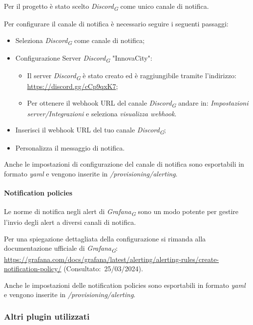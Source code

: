 Per il progetto è stato scelto \textit{Discord}\textsubscript{\textit{G}} come unico canale di notifica.

Per configurare il canale di notifica è necessario seguire i seguenti passaggi:
\begin{itemize}
    \item Seleziona \textit{Discord}\textsubscript{\textit{G}} come canale di notifica;
    \item Configurazione Server \textit{Discord}\textsubscript{\textit{G}} "InnovaCity":
    \begin{itemize}
        \item Il server \textit{Discord}\textsubscript{\textit{G}} è stato creato ed è raggiungibile tramite l'indirizzo: \url{https://discord.gg/cCp9qxK7};
        \item Per ottenere il webhook URL del canale \textit{Discord}\textsubscript{\textit{G}} andare in: \textit{Impostazioni server/Integrazioni} e seleziona \textit{visualizza webhook}.
    \end{itemize}
    \item Inserisci il webhook URL del tuo canale \textit{Discord}\textsubscript{\textit{G}};
    \item Personalizza il messaggio di notifica.
    
\end{itemize}

Anche le impostazioni di configurazione del canale di notifica sono esportabili in formato \textit{yaml} e vengono inserite in \textit{/provisioning/alerting}.



\paragraph{Notification policies}
Le norme di notifica negli alert di \textit{Grafana}\textsubscript{\textit{G}} sono un modo potente per gestire l'invio degli alert a diversi canali di notifica.

Per una spiegazione dettagliata della configurazione si rimanda alla documentazione ufficiale di \textit{Grafana}\textsubscript{\textit{G}}: \url{https://grafana.com/docs/grafana/latest/alerting/alerting-rules/create-notification-policy/} (Consultato:~25/03/2024).

Anche le impostazioni delle notification policies sono esportabili in formato \textit{yaml} e vengono inserite in \textit{/provisioning/alerting}.

\subsubsection{Altri plugin utilizzati}
